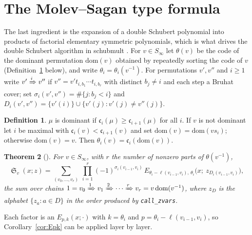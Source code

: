 \documentclass{amsart}
\newtheorem{theorem}{Theorem}[section]
\theoremstyle{definition}
\newtheorem{definition}[theorem]{Definition}
\theoremstyle{remark}
\DeclareMathOperator{\sch}{\mathfrak{S}}
\newcommand{\code}{\mathfrak{c}}
\newcommand{\Tom}[1]{\ensuremath{\xRightarrow{#1}}}
\newcommand{\schubmult}{\textsf{schubmult}}
\newcommand{\pyid}[1]{\texttt{#1}}
\begin{document}
\section{The Molev--Sagan type formula}

The last ingredient is the expansion of a double Schubert polynomial into products of
factorial elementary symmetric polynomials, which is what drives the double Schubert
algorithm in \schubmult{} \cite{samuelmolev}. For $v\in S_\infty$ let $\theta(v)$ be the
code of the dominant permutation $\mathrm{dom}(v)$ obtained by repeatedly sorting the code of
$v$ (Definition~\ref{def:theta} below), and write $\theta_i = \theta_i(v^{-1})$. For
permutations $v',v''$ and $i\ge1$ write $v'\Tom{i}v''$ if $v'' = v't_{i,b_1}\cdots t_{i,b_r}$
with distinct $b_j\ne i$ and each step a Bruhat cover; set $\sigma_i(v',v'') = \#\{j : b_j<i\}$
and $D_i(v',v'') = \{v'(i)\}\cup\{v'(j) : v'(j)\ne v''(j)\}$.

\begin{definition}\label{def:theta}
$\mu$ is dominant if $\code_i(\mu)\ge\code_{i+1}(\mu)$ for all $i$. If $v$ is not dominant let
$i$ be maximal with $\code_i(v)<\code_{i+1}(v)$ and set $\mathrm{dom}(v)=\mathrm{dom}(vs_i)$;
otherwise $\mathrm{dom}(v)=v$. Then $\theta_i(v) = \code_i(\mathrm{dom}(v))$.
\end{definition}

\begin{theorem}[{\cite{samuelmolev}}]\label{thm:vpath}
For $v\in S_\infty$, with $r$ the number of nonzero parts of $\theta(v^{-1})$,
\[
\sch_v(x;z) = \sum_{(v_0,\dots,v_r)}\ \prod_{i=1}^{r}(-1)^{\sigma_i(v_{i-1},v_i)}\,
E_{\theta_i - \ell(v_{i-1},v_i),\ \theta_i}\bigl(x;\ z_{D_i(v_{i-1},v_i)}\bigr),
\]
the sum over chains $1 = v_0\Tom{1}v_1\Tom{2}\cdots\Tom{r}v_r = v\,\mathrm{dom}(v^{-1})$, where
$z_D$ is the alphabet $\{z_a : a\in D\}$ in the order produced by \pyid{call\_zvars}.
\end{theorem}

Each factor is an $E_{p,k}(x;\cdot)$ with $k=\theta_i$ and $p = \theta_i - \ell(v_{i-1},v_i)$, so
Corollary~\ref{cor:Epk} can be applied layer by layer.
\end{document}
